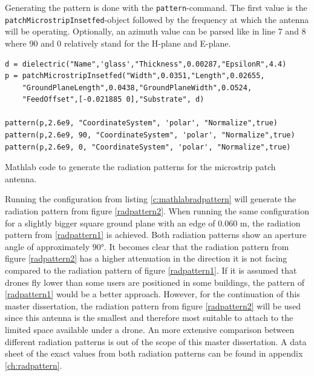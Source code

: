 Generating the pattern is done with the \verb|pattern|-command. The first value is the \\ \verb|patchMicrostripInsetfed|-object followed by the frequency
at which the antenna will be operating. Optionally, an azimuth value can be parsed like in line 7 and 8 where 90 and 0 relatively stand for the H-plane and E-plane.

\begin{listing}[h!]
\begin{verbatim}
d = dielectric("Name",'glass',"Thickness",0.00287,"EpsilonR",4.4)
p = patchMicrostripInsetfed("Width",0.0351,"Length",0.02655,
    "GroundPlaneLength",0.0438,"GroundPlaneWidth",0.O524,
    "FeedOffset",[-0.021885 0],"Substrate", d)

pattern(p,2.6e9, "CoordinateSystem", 'polar', "Normalize",true)
pattern(p,2.6e9, 90, "CoordinateSystem", 'polar', "Normalize",true)
pattern(p,2.6e9, 0, "CoordinateSystem", 'polar', "Normalize",true)
\end{verbatim}
\caption{Mathlab code to generate the radiation patterns for the microstrip patch antenna.}
\label{c:mathlabradpattern}
\end{listing}

Running the configuration from listing \ref{c:mathlabradpattern} will generate the radiation pattern from figure \ref{radpattern2}.
When running the same configuration for a slightly bigger square ground plane with an edge of 0.060 m, the radiation pattern from \ref{radpattern1} is
achieved. Both radiation patterns show an aperture angle of approximately 90°. It becomes clear that the radiation pattern from figure \ref{radpattern2} has a higher attenuation in the direction it is not facing compared to
the radiation pattern of figure \ref{radpattern1}. If it is assumed that drones fly lower than some users are positioned in some buildings, the pattern of 
\ref{radpattern1} would be a better approach. 
However, for the continuation of this master dissertation, the radiation pattern from figure \ref{radpattern2} 
will be used since this antenna is the smallest
and therefore most suitable to attach to the limited space available under a drone. 
An more extensive comparison between different radiation patterns is out of the scope of this master dissertation. 
A data sheet of the exact values from both radiation patterns can be
found in appendix \ref{ch:radpattern}.


